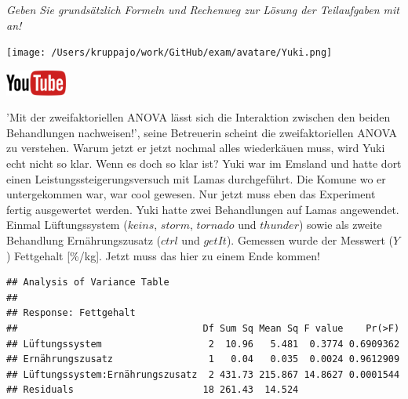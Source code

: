 \documentclass[a4paper, 9pt]{scrartcl}\usepackage[]{graphicx}\usepackage[]{xcolor}
\makeatletter
\newenvironment{kframe}{%
 \def\at@end@of@kframe{}%
 \ifinner\ifhmode%
  \def\at@end@of@kframe{\end{minipage}}%
  \begin{minipage}{\columnwidth}%
 \fi\fi%
 \def\FrameCommand##1{\hskip\@totalleftmargin \hskip-\fboxsep
 \colorbox{shadecolor}{##1}\hskip-\fboxsep
     \hskip-\linewidth \hskip-\@totalleftmargin \hskip\columnwidth}%
 \MakeFramed {\advance\hsize-\width
   \@totalleftmargin\z@ \linewidth\hsize
   \@setminipage}}%
 {\par\unskip\endMakeFramed%
 \at@end@of@kframe}
\newenvironment{knitrout}{}{} %
\makeatother
\begin{document}
\textit{Geben Sie grundsätzlich Formeln und Rechenweg zur Lösung der Teilaufgaben mit an!} \\[1Ex]
 

 
\begin{minipage}[t]{0.5\textwidth}
\texttt{[image: /Users/kruppajo/work/GitHub/exam/avatare/Yuki.png]}
\end{minipage}
\begin{minipage}[t]{0.5\textwidth}
\hfill
\href{https://youtu.be/rWTyHXXlYjY}{\includegraphics[width = 2cm]{img/youtube}}\\[1Ex]
\end{minipage}
\vspace{1ex}



'Mit der zweifaktoriellen ANOVA lässt sich die Interaktion zwischen den beiden Behandlungen nachweisen!', seine Betreuerin scheint die zweifaktoriellen ANOVA zu verstehen. Warum jetzt er jetzt nochmal alles wiederkäuen muss, wird Yuki echt nicht so klar. Wenn es doch so klar ist? Yuki war im Emsland und hatte dort einen Leistungssteigerungsversuch mit Lamas durchgeführt. Die Komune wo er untergekommen war, war cool gewesen. Nur jetzt muss eben das Experiment fertig ausgewertet werden. Yuki hatte zwei Behandlungen auf Lamas angewendet. Einmal Lüftungssystem ($keins$, $storm$, $tornado$ und $thunder$) sowie als zweite Behandlung Ernährungszusatz ($ctrl$ und $getIt$). Gemessen wurde der Messwert ($Y$) Fettgehalt [\%/kg]. Jetzt muss das hier zu einem Ende kommen!

\begin{knitrout}
\color{fgcolor}\begin{kframe}
\begin{verbatim}
## Analysis of Variance Table
## 
## Response: Fettgehalt
##                                 Df Sum Sq Mean Sq F value    Pr(>F)
## Lüftungssystem                   2  10.96   5.481  0.3774 0.6909362
## Ernährungszusatz                 1   0.04   0.035  0.0024 0.9612909
## Lüftungssystem:Ernährungszusatz  2 431.73 215.867 14.8627 0.0001544
## Residuals                       18 261.43  14.524
\end{verbatim}
\end{kframe}
\end{knitrout}
\end{document}
